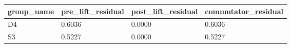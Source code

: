 \begin{tabular}{llll}
\toprule
group_name & pre_lift_residual & post_lift_residual & commutator_residual\\
\midrule
D4 & 0.6036 & 0.0000 & 0.6036\\
S3 & 0.5227 & 0.0000 & 0.5227\\
\bottomrule
\end{tabular}
